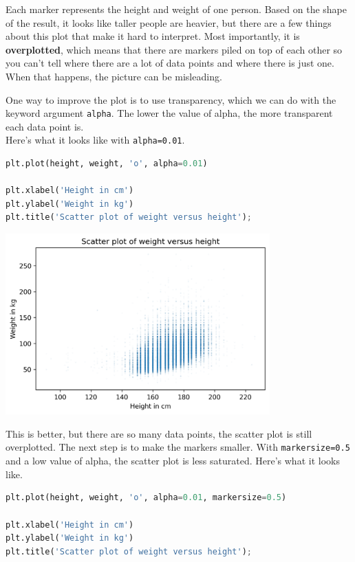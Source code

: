 Each marker represents the height and weight of one person. Based on the
shape of the result, it looks like taller people are heavier, but there
are a few things about this plot that make it hard to interpret. Most
importantly, it is \textbf{overplotted}, which means that there are
markers piled on top of each other so you can't tell where there are a
lot of data points and where there is just one. When that happens, the
picture can be misleading.

One way to improve the plot is to use transparency, which we can do with
the keyword argument \passthrough{\lstinline!alpha!}. The lower the
value of alpha, the more transparent each data point is.\\
Here's what it looks like with \passthrough{\lstinline!alpha=0.01!}.

\begin{lstlisting}[language=Python,style=source]
plt.plot(height, weight, 'o', alpha=0.01)

plt.xlabel('Height in cm')
plt.ylabel('Weight in kg')
plt.title('Scatter plot of weight versus height');
\end{lstlisting}

\begin{center}
\includegraphics[width=4in]{chapters/09_relationships_files/09_relationships_16_0.png}
\end{center}

This is better, but there are so many data points, the scatter plot is
still overplotted. The next step is to make the markers smaller. With
\passthrough{\lstinline!markersize=0.5!} and a low value of alpha, the
scatter plot is less saturated. Here's what it looks like.

\begin{lstlisting}[language=Python,style=source]
plt.plot(height, weight, 'o', alpha=0.01, markersize=0.5)

plt.xlabel('Height in cm')
plt.ylabel('Weight in kg')
plt.title('Scatter plot of weight versus height');
\end{lstlisting}

